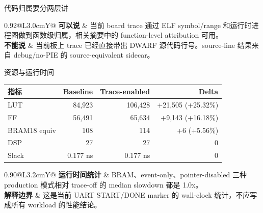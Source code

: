 \documentclass[aspectratio=169,10pt]{beamer}
\begin{document}
\begin{frame}{代码归属要分两层讲}
  \vskip0.1cm
  \begin{center}
  \renewcommand{\arraystretch}{1.24}
  \begin{tabularx}{0.92\linewidth}{@{}L{3.0cm}Y@{}}
    \toprule
    \textbf{可以说} & 当前 board trace 通过 ELF symbol/range 和运行时进程图做到函数级归属，相关摘要中的 function-level attribution 可用。 \\
    \textbf{不能说} & 当前板上 trace 已经直接带出 DWARF 源代码行号。source-line 结果来自 debug/no-PIE 的 source-equivalent sidecar。 \\
    \bottomrule
  \end{tabularx}
  \end{center}
  \vskip0.15cm
\end{frame}

\begin{frame}{资源与运行时间}
  \vskip0.05cm
  \begin{center}\scriptsize
  \renewcommand{\arraystretch}{1.16}
  \begin{tabular}{@{}lrrr@{}}
    \toprule
    \textbf{指标} & \textbf{Baseline} & \textbf{Trace-enabled} & \textbf{Delta} \\
    \midrule
    LUT & 84,923 & 106,428 & +21,505 (+25.32\%) \\
    \rowcolor{black!4}
    FF & 56,491 & 65,634 & +9,143 (+16.18\%) \\
    BRAM18 equiv & 108 & 114 & +6 (+5.56\%) \\
    \rowcolor{black!4}
    DSP & 27 & 27 & 0 \\
    Slack & 0.177 ns & 0.177 ns & 0 \\
    \bottomrule
  \end{tabular}
  \end{center}
  \vskip0.2cm
  \begin{center}
  \renewcommand{\arraystretch}{1.15}
  \begin{tabularx}{0.90\linewidth}{@{}L{3.2cm}Y@{}}
    \toprule
    \textbf{运行时间统计} & BRAM、event-only、pointer-disabled 三种 production 模式相对 trace-off 的 median slowdown 都是 1.0x。 \\
    \textbf{解释边界} & 这是当前 UART START/DONE marker 的 wall-clock 统计，不应写成所有 workload 的性能结论。 \\
    \bottomrule
  \end{tabularx}
  \end{center}
\end{frame}
\end{document}
